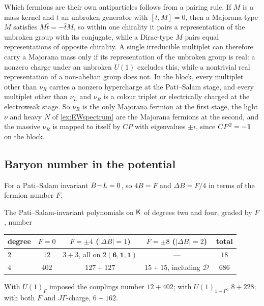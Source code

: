 Which fermions are their own antiparticles follows from a pairing rule. If $M$ is a mass kernel and $t$ an unbroken generator with $[t,M]=0$, then a Majorana-type $M$
satisfies $M\hat t=-\hat tM$, so within one chirality it pairs a representation of the unbroken group with its conjugate, while a Dirac-type $M$ pairs equal
representations of opposite chirality. A single irreducible multiplet can therefore carry a Majorana mass only if its representation of the unbroken group is
real: a nonzero charge under an unbroken $U(1)$ excludes this, while a nontrivial real representation of a non-abelian group does not. In the block, every multiplet
other than $\nu_R$ carries a nonzero hypercharge at the Pati--Salam stage, and every multiplet other than $\nu_L$ and $\nu_R$ is a colour triplet or electrically
charged at the electroweak stage. So $\nu_R$ is the only Majorana fermion at the first stage, the light $\nu$ and heavy $N$ of \cref{ex:EWspectrum} are the
Majorana fermions at the second, and the massive $\nu_R$ is mapped to itself by $CP$ with eigenvalues $\pm i$, since $CP^2=-\mathbf 1$ on the block.

\subsection{Baryon number in the potential}

For a Pati--Salam invariant $B\!-\!L=0$, so $4B=F$ and $\Delta B=F/4$ in terms of the fermion number $F$.

\begin{theorem}
\label{thm:Bcounts}
The Pati--Salam-invariant polynomials on $\mathsf K$ of degrees two and four, graded by $F$, number
\begin{center}
\small
\begin{tabular}{@{}lcccc@{}}
\toprule
degree & $F=0$ & $F=\pm4$ ($|\Delta B|=1$) & $F=\pm8$ ($|\Delta B|=2$) & total\\
\midrule
$2$ & $12$ & $3+3$, all on $2(\mathbf6,\mathbf1,\mathbf1)$ & --- & $18$\\
$4$ & $402$ & $127+127$ & $15+15$, including $\mathcal D$ & $686$\\
\bottomrule
\end{tabular}
\end{center}
With $U(1)_F$ imposed the couplings number $12+402$; with $U(1)_{1-\Gamma}$, $8+228$; with both $F$ and $J\Gamma$-charge, $6+162$.
\end{theorem}

